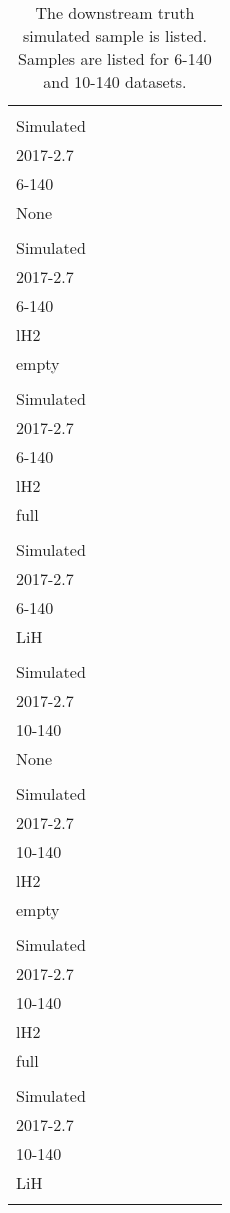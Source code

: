 \begin{landscape}
\begin{table}
\centering
\caption{The downstream truth simulated sample is listed.  Samples are listed for 6-140 and 10-140 datasets.\label{tab:mc_cuts_summary_4_1}}
\begin{tabular}[pos]{l|cccccccc}
                                                   & \splitcell{\\Simulated\\2017-2.7\\6-140\\None\\} & \splitcell{\\Simulated\\2017-2.7\\6-140\\lH2\\empty\\} & \splitcell{\\Simulated\\2017-2.7\\6-140\\lH2\\full\\} & \splitcell{\\Simulated\\2017-2.7\\6-140\\LiH\\} & \splitcell{\\Simulated\\2017-2.7\\10-140\\None\\} & \splitcell{\\Simulated\\2017-2.7\\10-140\\lH2\\empty\\} & \splitcell{\\Simulated\\2017-2.7\\10-140\\lH2\\full\\} & \splitcell{\\Simulated\\2017-2.7\\10-140\\LiH\\} \\

\end{tabular}
\end{table}
\end{landscape}
